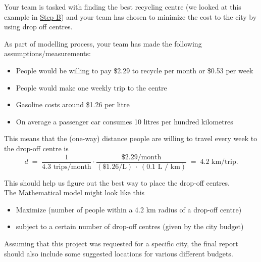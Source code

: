 \begin{example}
Your team is tasked with finding the best recycling centre (we looked at this example in \hyperref[mindmap]{Step B}) and your  team has chosen to minimize the cost to the city by using drop off centres.

As part of modelling process, your team has made the following assumptions/measurements:
\begin{itemize}
	\item People would be willing to pay \$2.29 to recycle per month or \$0.53 per week
	\item People would make one weekly trip to the centre
	\item Gasoline costs around \$1.26 per litre
	\item On average a passenger car consumes 10 litres per hundred kilometres\\
\end{itemize}

This means that the (one-way) distance people are willing to travel every week to the drop-off centre is
$$
d \;=\; \frac{1}{4.3 \text{ trips/month}} \cdot \frac{\$2.29 / {\text{month}} }{(\$1.26 \text{/L}) \ \cdot\  (0.1 \text{ L / km})} \;=\; 4.2 \text{  km/trip}.
$$

This should help us figure out the best way to place the drop-off centres. \\

The Mathematical model might look like this

\begin{itemize}
	\item Maximize (number of people within a 4.2 km radius of a drop-off centre)
	\item subject to a certain number of drop-off centres (given by the city budget) %
\end{itemize}

\end{example}

\begin{graybox}
Assuming that this project was requested for a specific city, the final report should also include some suggested locations for various different budgets.	
\end{graybox}


%



